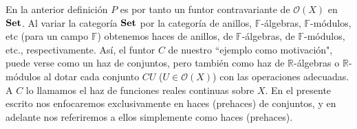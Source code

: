 En la anterior definición $P$ es por tanto un funtor contravariante de $\mathcal{O}(X)$ en $\normalfont{\textbf{Set}}$. Al variar la categoría $\normalfont{\textbf{Set}}$ por la categoría de anillos, $\mathbb{F}$-álgebras, $\mathbb{F}$-módulos, etc (para un campo $\mathbb{F}$) obtenemos haces de anillos, de $\mathbb{F}$-álgebras, de $\mathbb{F}$-módulos, etc., respectivamente. Así, el funtor $C$ de nuestro ``ejemplo como motivación", puede verse como un haz de conjuntos, pero también como haz de $\mathbb{R}$-álgebras o $\mathbb{R}$-módulos al dotar cada conjunto $CU$ ($U\in \mathcal{O}(X)$) con las operaciones adecuadas. A $C$ lo llamamos el haz de funciones reales continuas sobre $X$. En el presente escrito nos enfocaremos exclusivamente en haces (prehaces) de conjuntos, y en adelante nos referiremos a ellos simplemente como haces (prehaces).  
